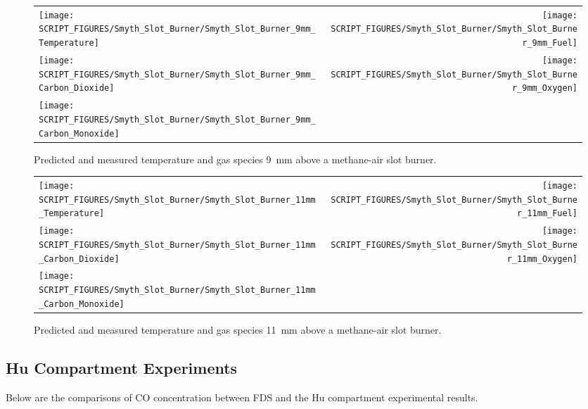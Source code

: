 \begin{figure}[p]
\begin{tabular*}{\textwidth}{l@{\extracolsep{\fill}}r}
\texttt{[image: SCRIPT\_FIGURES/Smyth\_Slot\_Burner/Smyth\_Slot\_Burner\_9mm\_Temperature]} &
\texttt{[image: SCRIPT\_FIGURES/Smyth\_Slot\_Burner/Smyth\_Slot\_Burner\_9mm\_Fuel]} \\
\texttt{[image: SCRIPT\_FIGURES/Smyth\_Slot\_Burner/Smyth\_Slot\_Burner\_9mm\_Carbon\_Dioxide]} &
\texttt{[image: SCRIPT\_FIGURES/Smyth\_Slot\_Burner/Smyth\_Slot\_Burner\_9mm\_Oxygen]} \\
\texttt{[image: SCRIPT\_FIGURES/Smyth\_Slot\_Burner/Smyth\_Slot\_Burner\_9mm\_Carbon\_Monoxide]} &
\end{tabular*}
\caption[Temperature and gas species predictions 9~mm above burner, Smyth experiment]
{Predicted and measured temperature and gas species 9~mm above a methane-air slot burner.}
\label{Smyth_Slot_Burner_9}
\end{figure}

\begin{figure}[p]
\begin{tabular*}{\textwidth}{l@{\extracolsep{\fill}}r}
\texttt{[image: SCRIPT\_FIGURES/Smyth\_Slot\_Burner/Smyth\_Slot\_Burner\_11mm\_Temperature]} &
\texttt{[image: SCRIPT\_FIGURES/Smyth\_Slot\_Burner/Smyth\_Slot\_Burner\_11mm\_Fuel]} \\
\texttt{[image: SCRIPT\_FIGURES/Smyth\_Slot\_Burner/Smyth\_Slot\_Burner\_11mm\_Carbon\_Dioxide]} &
\texttt{[image: SCRIPT\_FIGURES/Smyth\_Slot\_Burner/Smyth\_Slot\_Burner\_11mm\_Oxygen]} \\
\texttt{[image: SCRIPT\_FIGURES/Smyth\_Slot\_Burner/Smyth\_Slot\_Burner\_11mm\_Carbon\_Monoxide]} &
\end{tabular*}
\caption[Temperature and gas species predictions 11~mm above burner, Smyth experiment]
{Predicted and measured temperature and gas species 11~mm above a methane-air slot burner.}
\label{Smyth_Slot_Burner_11}
\end{figure}

\clearpage

\subsection{Hu Compartment Experiments}

Below are the comparisons of CO concentration between FDS and the Hu compartment experimental results.

